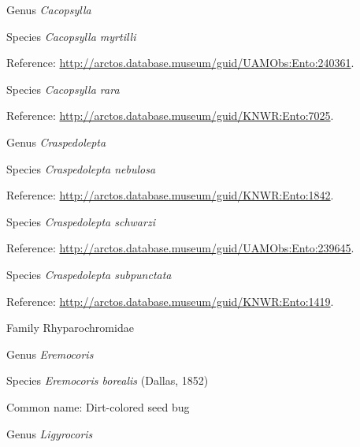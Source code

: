 \documentclass[9pt, article]{memoir}
\begin{document}
\begin{multicols}{2}
\vspace{6pt}\noindent\hspace{30pt}Genus \textit{Cacopsylla}


\vspace{6pt}\noindent\hspace{36pt}Species \textit{Cacopsylla myrtilli}


Reference: 
\url{http://arctos.database.museum/guid/UAMObs:Ento:240361}.

\vspace{6pt}\noindent\hspace{36pt}Species \textit{Cacopsylla rara}


Reference: 
\url{http://arctos.database.museum/guid/KNWR:Ento:7025}.

\vspace{6pt}\noindent\hspace{30pt}Genus \textit{Craspedolepta}


\vspace{6pt}\noindent\hspace{36pt}Species \textit{Craspedolepta nebulosa}


Reference: 
\url{http://arctos.database.museum/guid/KNWR:Ento:1842}.

\vspace{6pt}\noindent\hspace{36pt}Species \textit{Craspedolepta schwarzi}


Reference: 
\url{http://arctos.database.museum/guid/UAMObs:Ento:239645}.

\vspace{6pt}\noindent\hspace{36pt}Species \textit{Craspedolepta subpunctata}


Reference: 
\url{http://arctos.database.museum/guid/KNWR:Ento:1419}.

\vspace{6pt}\noindent\hspace{24pt}Family Rhyparochromidae


\vspace{6pt}\noindent\hspace{30pt}Genus \textit{Eremocoris}


\vspace{6pt}\noindent\hspace{36pt}Species \textit{Eremocoris borealis} (Dallas, 1852)


Common name: Dirt-colored seed bug

\vspace{6pt}\noindent\hspace{30pt}Genus \textit{Ligyrocoris}



\end{multicols}
\end{document}
